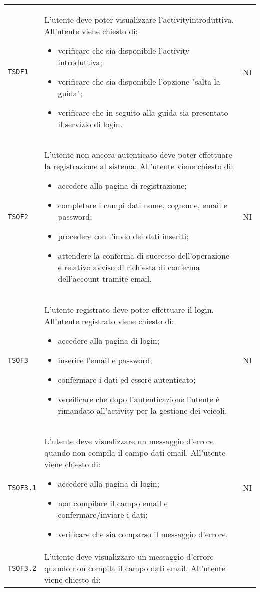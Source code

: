 \begin{longtable}{ >{\centering}p{} >{\centering}p{}
			>{\centering}p{}}
		 \texttt{TSDF1}	&	L'utente deve poter visualizzare l'activity\glosp introduttiva. All'utente viene chiesto di:
		 \begin{itemize}
		 	\item verificare che sia disponibile l'activity introduttiva;
		 	\item verificare che sia disponibile l'opzione "salta la guida";
		 	\item verificare che in seguito alla guida sia presentato il servizio di login. 
		 \end{itemize}	&	NI	\tabularnewline
		 \texttt{TSOF2}	&	L'utente non ancora autenticato deve poter effettuare la registrazione al sistema. All'utente viene chiesto di:
		 \begin{itemize}
		 	\item accedere alla pagina di registrazione;
		 	\item completare i campi dati nome, cognome, email e password;
		 	\item procedere con l'invio dei dati inseriti;
		 	\item attendere la conferma di successo dell'operazione e relativo avviso di richiesta di conferma dell'account tramite email.
		 \end{itemize}	&	NI	\tabularnewline
		 \texttt{TSOF3}	&	L'utente registrato deve poter effettuare il login. All'utente registrato viene chiesto di:
		 \begin{itemize}
		 	\item accedere alla pagina di login;
		 	\item inserire l'email e password;
		 	\item confermare i dati ed essere autenticato;
		 	\item vereificare che dopo l'autenticazione l'utente è rimandato all'activity per la gestione dei veicoli.
		 \end{itemize}	&	NI	\tabularnewline
		 \texttt{TSOF3.1}	&	L'utente deve visualizzare un messaggio d'errore quando non compila il campo dati email. All'utente viene chiesto di:
		 \begin{itemize}
		 	\item accedere alla pagina di login;
		 	\item non compilare il campo email e confermare/inviare i dati;
		 	\item verificare che sia comparso il messaggio d'errore.
		 \end{itemize}	&	NI	\tabularnewline
		 \texttt{TSOF3.2}	&	L'utente deve visualizzare un messaggio d'errore quando non compila il campo dati email. All'utente viene chiesto di:

\end{longtable}

